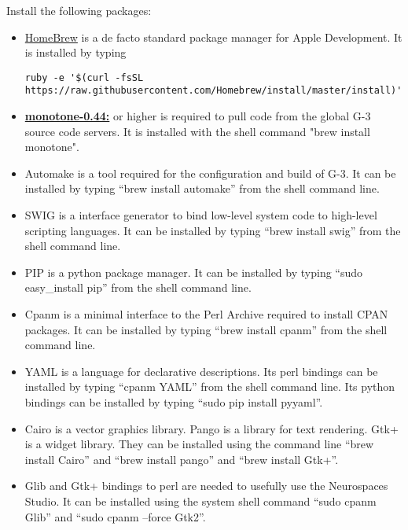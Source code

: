 \documentclass[12pt]{article}
\begin{document}
Install the following packages:
\begin{itemize}
\item[] \href{https://coolestguidesontheplanet.com/installing-homebrew-on-os-x-el-capitan-10-11-package-manager-for-unix-apps/}{HomeBrew} is a de facto standard package manager for Apple Development.  It is installed by typing
\begin{verbatim}
ruby -e '$(curl -fsSL https://raw.githubusercontent.com/Homebrew/install/master/install)'
\end{verbatim}

\item[]\href{http://monotone.ca/}{\bf monotone-0.44:} or higher is required to pull code from the global G-3 source code servers.  It is installed with the shell command "brew install monotone".

\item[] Automake is a tool required for the configuration and build of G-3.  It can be installed by typing ``brew install automake'' from the shell command line.

\item[] SWIG is a interface generator to bind low-level system code to high-level scripting languages.  It can be installed by typing ``brew install swig'' from the shell command line.

\item[] PIP is a python package manager.  It can be installed by typing ``sudo easy\_install pip'' from the shell command line.

\item[] Cpanm is a minimal interface to the Perl Archive required to install CPAN packages.  It can be installed by typing ``brew install cpanm'' from the shell command line.

\item[] YAML is a language for declarative descriptions.  Its perl bindings can be installed by typing ``cpanm YAML'' from the shell command line.  Its python bindings can be installed by typing ``sudo pip install pyyaml''.

\item[] Cairo is a vector graphics library.  Pango is a library for text rendering.  Gtk+ is a widget library.  They can be installed using the command line ``brew install Cairo'' and ``brew install pango'' and ``brew install Gtk+''.

\item[] Glib and Gtk+ bindings to perl are needed to usefully use the Neurospaces Studio.  It can be installed using the system shell command ``sudo cpanm Glib'' and ``sudo cpanm --force Gtk2''.


\end{itemize}
\end{document}
